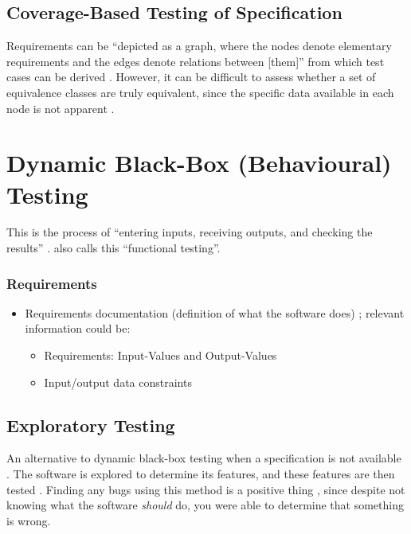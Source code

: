 \subsection[Coverage-Based Testing of Specification]{Coverage-Based Testing of
      Specification \citep[pp.~425-426]{vanVliet2000}}

Requirements can be ``depicted as a graph, where the nodes denote elementary
requirements and the edges denote relations between [them]'' from which test
cases can be derived \citep[p.~425]{vanVliet2000}. However, it can
be difficult to assess whether a set of equivalence classes are truly
equivalent, since the specific data available in each node is not apparent
\citep[p.~426]{vanVliet2000}.

\section[Dynamic Black-Box (Behavioural) Testing]{Dynamic Black-Box
  (Behavioural) Testing \citep[pp.~64-65]{Patton2006}}

This is the process of ``entering inputs, receiving outputs, and checking the
results'' \citep[p.~64]{Patton2006}. \citep[p.~399]{vanVliet2000}
also calls this ``functional testing''.

\subsubsection{Requirements}
\begin{itemize}
      \item Requirements documentation (definition of what the software does)
            \citep[p.~64]{Patton2006}; relevant information could be:
            \begin{itemize}
                  \item Requirements: Input-Values and Output-Values
                  \item Input/output data constraints
            \end{itemize}
\end{itemize}

\subsection[Exploratory Testing]{Exploratory Testing \citep[p.~65]{Patton2006}}

An alternative to dynamic black-box testing when a specification is not
available \citep[p.~65]{Patton2006}. The software is explored to
determine its features, and these features are then tested
\citep[p.~65]{Patton2006}. Finding any bugs using this method is a
positive thing \citep[p.~65]{Patton2006}, since despite not knowing
what the software \emph{should} do, you were able to determine that something
is wrong.

